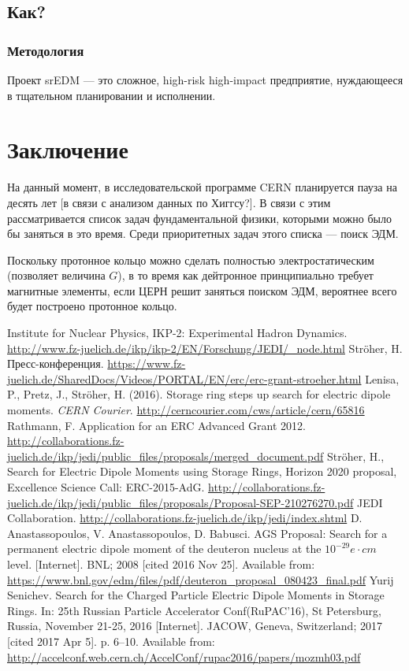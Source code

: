 \documentclass{extarticle}
\begin{document}
\subsection{Как?}
\subsubsection{Методология}
Проект srEDM --- это сложное, high-risk high-impact предприятие, нуждающееся в тщательном планировании и исполнении. 

		
\section*{Заключение}
На данный момент, в исследовательской программе CERN планируется пауза на десять лет [в связи с анализом данных по Хиггсу?]. В связи с этим рассматривается список задач фундаментальной физики, которыми можно было бы заняться в это время. Среди приоритетных задач этого списка --- поиск ЭДМ. 

Поскольку протонное кольцо можно сделать полностью электростатическим (позволяет величина $G$), в то время как дейтронное принципиально требует магнитные элементы, если ЦЕРН решит заняться поиском ЭДМ, вероятнее всего будет построено протонное кольцо.
\begin{thebibliography}{0}
	Institute for Nuclear Physics, IKP-2: Experimental Hadron Dynamics. \url{http://www.fz-juelich.de/ikp/ikp-2/EN/Forschung/JEDI/_node.html}
	Str\"oher, H. Пресс-конференция. \url{https://www.fz-juelich.de/SharedDocs/Videos/PORTAL/EN/erc/erc-grant-stroeher.html}
	Lenisa, P., Pretz, J., Str\"oher, H. (2016). Storage ring steps up search for electric dipole moments. \textit{CERN Courier}. \url{http://cerncourier.com/cws/article/cern/65816}
	Rathmann, F. Application for an ERC Advanced Grant 2012. \url{http://collaborations.fz-juelich.de/ikp/jedi/public_files/proposals/merged_document.pdf}
	Str\"oher, H., Search for Electric Dipole Moments using Storage Rings, Horizon 2020 proposal, Excellence Science Call: ERC-2015-AdG. \url{http://collaborations.fz-juelich.de/ikp/jedi/public_files/proposals/Proposal-SEP-210276270.pdf}
	JEDI Collaboration. \url{http://collaborations.fz-juelich.de/ikp/jedi/index.shtml}
	D. Anastassopoulos, V. Anastassopoulos, D. Babusci. AGS Proposal: Search for a permanent electric dipole moment of the deuteron nucleus at the $10^{-29} e\cdot cm$ level. [Internet]. BNL; 2008 [cited 2016 Nov 25]. Available from: \url{https://www.bnl.gov/edm/files/pdf/deuteron_proposal_080423_final.pdf}
	Yurij Senichev. Search for the Charged Particle Electric Dipole Moments in Storage Rings. In: 25th Russian Particle Accelerator Conf(RuPAC’16), St Petersburg, Russia, November 21-25, 2016 [Internet]. JACOW, Geneva, Switzerland; 2017 [cited 2017 Apr 5]. p. 6–10. Available from: \url{http://accelconf.web.cern.ch/AccelConf/rupac2016/papers/mozmh03.pdf}
	
\end{thebibliography}
\end{document}
